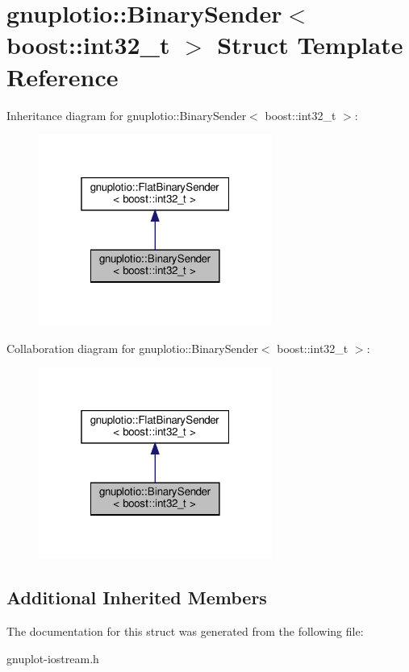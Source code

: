 \hypertarget{structgnuplotio_1_1BinarySender_3_01boost_1_1int32__t_01_4}{}\section{gnuplotio\+:\+:Binary\+Sender$<$ boost\+:\+:int32\+\_\+t $>$ Struct Template Reference}
\label{structgnuplotio_1_1BinarySender_3_01boost_1_1int32__t_01_4}


Inheritance diagram for gnuplotio\+:\+:Binary\+Sender$<$ boost\+:\+:int32\+\_\+t $>$\+:
\nopagebreak
\begin{figure}[H]
\begin{center}
\leavevmode
\includegraphics[width=217pt]{structgnuplotio_1_1BinarySender_3_01boost_1_1int32__t_01_4__inherit__graph}
\end{center}
\end{figure}


Collaboration diagram for gnuplotio\+:\+:Binary\+Sender$<$ boost\+:\+:int32\+\_\+t $>$\+:
\nopagebreak
\begin{figure}[H]
\begin{center}
\leavevmode
\includegraphics[width=217pt]{structgnuplotio_1_1BinarySender_3_01boost_1_1int32__t_01_4__coll__graph}
\end{center}
\end{figure}
\subsection*{Additional Inherited Members}


The documentation for this struct was generated from the following file\+:\begin{DoxyCompactItemize}
\item 
gnuplot-\/iostream.\+h\end{DoxyCompactItemize}
